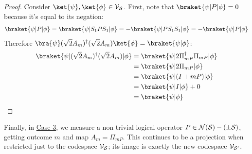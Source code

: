 \begin{proposition}
\begin{proof}
        Consider $\ket{\psi}, \ket{\phi} \in \VVV_\SSS$.
        First, note that $\braket{\psi | P | \phi} = 0$ because it's equal to its negation:
        \begin{equation}\label{eq:P_phi_orthogonal_to_psi}
        \braket{\psi | P | \phi}
        = \braket{\psi | S_1 P S_1| \phi}
        = - \braket{\psi | P S_1 S_1| \phi}
        = - \braket{\psi | P | \phi}
        \end{equation}
        Therefore $\bra{\psi} (\sqrt{2} A_m)^\dagger (\sqrt{2} A_m) \ket{\phi} = \braket{\psi | \phi}$:
        \begin{equation}\label{eq:A_preserves_inner_products}
        \begin{aligned}
            \braket{\psi | (\sqrt{2} A_m)^\dagger (\sqrt{2} A_m) | \phi}
            &= \braket{\psi | 2 \Pi_{mP}^\dagger \Pi_{mP} | \phi} \\
            &= \braket{\psi | 2\Pi_{mP} | \phi} \\
            &= \braket{\psi | (I + mP) | \phi} \\
            &= \braket{\psi | I | \phi} + 0\\
            &= \braket{\psi | \phi} \\
        \end{aligned}
        \end{equation}
    \end{proof}
\end{proposition}

Finally, in \hyperref[thm:stabilizer_group_update_measurement:case3]{Case 3}, we measure a non-trivial logical operator $P \in \mathcal{N}(\mathcal{S}) - (\pm \mathcal{S})$, getting outcome $m$ and map $A_m = \Pi_{mP}$.
This continues to be a projection when restricted just to the codespace $\mathcal{V}_{\mathcal{S}}$; its image is exactly the new codespace $\mathcal{V}_{\mathcal{S}'}$.

